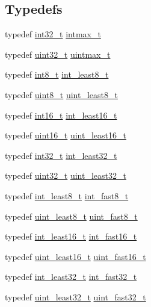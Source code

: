 \subsection*{Typedefs}
\begin{DoxyCompactItemize}
\item 
typedef \hyperlink{stdint_8h_a32f2e37ee053cf2ce8ca28d1f74630e5}{int32\-\_\-t} \hyperlink{orstdint_8h_a1a3f3321a0166a004bde0a1e72553f2b}{intmax\-\_\-t}
\item 
typedef \hyperlink{stdint_8h_a435d1572bf3f880d55459d9805097f62}{uint32\-\_\-t} \hyperlink{orstdint_8h_a7643e68e022fde0d947e8dc252f716d6}{uintmax\-\_\-t}
\item 
typedef \hyperlink{stdint_8h_aef44329758059c91c76d334e8fc09700}{int8\-\_\-t} \hyperlink{orstdint_8h_aadfd725efbf565422ab13db91ccca53c}{int\-\_\-least8\-\_\-t}
\item 
typedef \hyperlink{stdint_8h_aba7bc1797add20fe3efdf37ced1182c5}{uint8\-\_\-t} \hyperlink{orstdint_8h_ac76e2383debd5a3b100514044828961a}{uint\-\_\-least8\-\_\-t}
\item 
typedef \hyperlink{stdint_8h_aa343fa3b3d06292b959ffdd4c4703b06}{int16\-\_\-t} \hyperlink{orstdint_8h_a17f379713bed2a28ac431760401253cd}{int\-\_\-least16\-\_\-t}
\item 
typedef \hyperlink{stdint_8h_a273cf69d639a59973b6019625df33e30}{uint16\-\_\-t} \hyperlink{orstdint_8h_a4f3f6e6631cb4aaeadf1c59ff597b2fb}{uint\-\_\-least16\-\_\-t}
\item 
typedef \hyperlink{stdint_8h_a32f2e37ee053cf2ce8ca28d1f74630e5}{int32\-\_\-t} \hyperlink{orstdint_8h_a2676b57a778795e5d0598970f1407f38}{int\-\_\-least32\-\_\-t}
\item 
typedef \hyperlink{stdint_8h_a435d1572bf3f880d55459d9805097f62}{uint32\-\_\-t} \hyperlink{orstdint_8h_ac0af81082969e5e3f4d939b1de7002ac}{uint\-\_\-least32\-\_\-t}
\item 
typedef \hyperlink{orstdint_8h_aadfd725efbf565422ab13db91ccca53c}{int\-\_\-least8\-\_\-t} \hyperlink{orstdint_8h_a77eeea3cce53483bdce021415431c1b4}{int\-\_\-fast8\-\_\-t}
\item 
typedef \hyperlink{orstdint_8h_ac76e2383debd5a3b100514044828961a}{uint\-\_\-least8\-\_\-t} \hyperlink{orstdint_8h_ae3a64b0efa0110e38359b34a0f265667}{uint\-\_\-fast8\-\_\-t}
\item 
typedef \hyperlink{orstdint_8h_a17f379713bed2a28ac431760401253cd}{int\-\_\-least16\-\_\-t} \hyperlink{orstdint_8h_a43505f8e7533c9a3b521288e927416ad}{int\-\_\-fast16\-\_\-t}
\item 
typedef \hyperlink{orstdint_8h_a4f3f6e6631cb4aaeadf1c59ff597b2fb}{uint\-\_\-least16\-\_\-t} \hyperlink{orstdint_8h_ad22db665b43dc5f23ed8a42e015373f3}{uint\-\_\-fast16\-\_\-t}
\item 
typedef \hyperlink{orstdint_8h_a2676b57a778795e5d0598970f1407f38}{int\-\_\-least32\-\_\-t} \hyperlink{orstdint_8h_adf31545bab2a12c9d12347af275bff5d}{int\-\_\-fast32\-\_\-t}
\item 
typedef \hyperlink{orstdint_8h_ac0af81082969e5e3f4d939b1de7002ac}{uint\-\_\-least32\-\_\-t} \hyperlink{orstdint_8h_a51c746994cab2a6465693f8746b7ab52}{uint\-\_\-fast32\-\_\-t}
\end{DoxyCompactItemize}
